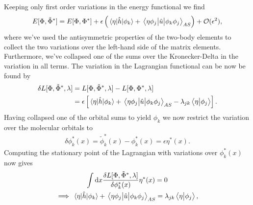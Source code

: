             Keeping only first order variations in the energy functional we find
            \begin{align}
                E[\Phi, \tilde{\Phi}^{*}]
                = E[\Phi, \Phi^{*}]
                + \epsilon\left( 
                    \mel{\eta}{\hat{h}}{\phi_k}
                    + \mel{\eta\phi_j}{\hat{u}}{\phi_k\phi_j}_{AS}
                 \right)
                + \mathcal{O}(\epsilon^2),
            \end{align}
            where we've used the antisymmetric properties of the two-body
            elements to collect the two variations over the left-hand side of
            the matrix elements.
            Furthermore, we've collapsed one of the sums over the
            Kronecker-Delta in the variation in all terms.
            The variation in the Lagrangian functional can be now be found by
            \begin{align}
                \delta L[\Phi, \tilde{\Phi}^{*}, \lambda]
                &=
                L[\Phi, \tilde{\Phi}^{*}, \lambda]
                -
                L[\Phi, \Phi^{*}, \lambda]
                \\
                &=
                \epsilon\left[ 
                    \mel{\eta}{\hat{h}}{\phi_k}
                    +
                    \mel{\eta\phi_j}{\hat{u}}{\phi_k\phi_j}_{AS}
                    - \lambda_{jk}
                    \braket{\eta}{\phi_j}
                 \right].
            \end{align}
            Having collapsed one of the orbital sums to yield $\phi_k$ we now
            restrict the variation over the molecular orbitals to
            \begin{align}
                \delta\phi^{*}_k(x)
                = \tilde{\phi}^{*}_k(x)
                - \phi^{*}_k(x)
                = \epsilon\eta^{*}(x).
            \end{align}
            Computing the stationary point of the Lagrangian with variations
            over $\phi^{*}_k(x)$ now gives
            \begin{gather}
                \int\dd x\frac{
                    \delta L[\Phi, \tilde{\Phi}^{*}, \lambda]
                }{\delta \phi^{*}_k(x)}
                \eta^{*}(x)
                = 0
                \\
                \implies
                \mel{\eta}{\hat{h}}{\phi_k}
                + \mel{\eta\phi_j}{\hat{u}}{\phi_k\phi_j}_{AS}
                = \lambda_{jk}\braket{\eta}{\phi_j},
                \label{eq:stationary-lagrangian}
            \end{gather}
